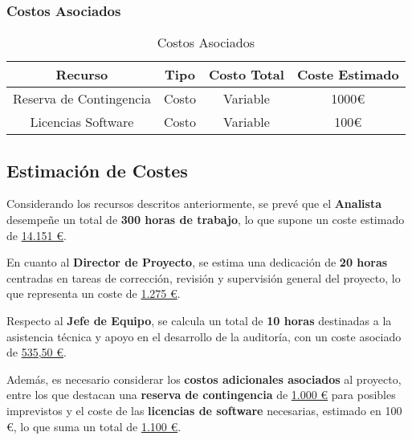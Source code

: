 \documentclass[a4paper, 10pt]{article}
\begin{document}
\subsubsection{Costos Asociados}

\begin{table}[H]
\centering
\renewcommand{\arraystretch}{1.5}
\begin{tabular}{|c|c|c|c|}
\hline
\textbf{Recurso} & \textbf{Tipo} & \textbf{Costo Total} & \textbf{Coste Estimado}  \\ \hline
Reserva de Contingencia & Costo & Variable & 1000€  \\ \hline
Licencias Software & Costo & Variable &  100€ \\ \hline
\end{tabular}
\caption{Costos Asociados}
\label{tab:costos_asociados}
\end{table}



\subsection{Estimación de Costes}

Considerando los recursos descritos anteriormente, se prevé que el \textbf{Analista} desempeñe un total de \textbf{300 horas de trabajo}, lo que supone un coste estimado de \underline{14.151 €}.  
\par\vspace{0.3cm}

En cuanto al \textbf{Director de Proyecto}, se estima una dedicación de \textbf{20 horas} centradas en tareas de corrección, revisión y supervisión general del proyecto, lo que representa un coste de \underline{1.275 €}.  
\par\vspace{0.3cm}

Respecto al \textbf{Jefe de Equipo}, se calcula un total de \textbf{10 horas} destinadas a la asistencia técnica y apoyo en el desarrollo de la auditoría, con un coste asociado de \underline{535,50 €}.  
\par\vspace{0.3cm}

Además, es necesario considerar los \textbf{costos adicionales asociados} al proyecto, entre los que destacan una \textbf{reserva de contingencia} de \underline{1.000 €} para posibles imprevistos y el coste de las \textbf{licencias de software} necesarias, estimado en 100 €, lo que suma un total de \underline{1.100 €}.  
\par\vspace{0.3cm}
\end{document}
